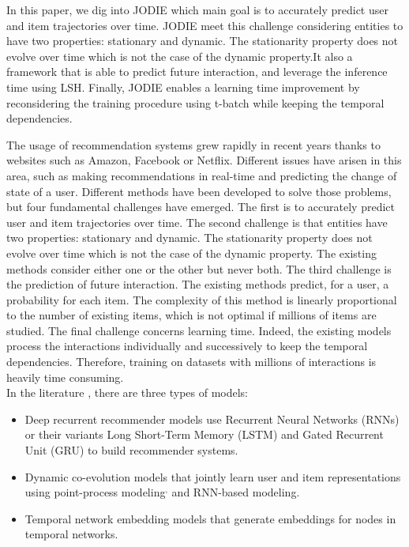 {In this paper, we dig into JODIE which main goal is to  accurately predict user and item trajectories over time. JODIE meet this challenge considering entities to have two properties: stationary and dynamic. The stationarity property does not evolve over time which is not the case of the dynamic property.It also a framework that is able to predict  future interaction, and leverage the inference time using LSH. Finally,  JODIE enables a learning time improvement by reconsidering the training procedure using t-batch while keeping the temporal dependencies.\\
}


\iffalse
The usage of recommendation systems grew rapidly in recent years thanks to websites such as Amazon, Facebook or Netflix. Different issues have arisen in this area, such as making recommendations in real-time and predicting the change of state of a user. Different methods have been developed to solve those problems, but four fundamental challenges have emerged. The first is to accurately predict user and item trajectories over time. The second challenge is that entities have two properties: stationary and dynamic. The stationarity property does not evolve over time which is not the case of the dynamic property. The existing methods consider either one or the other but never both. The third challenge is the prediction of future interaction. The existing methods predict, for a user, a probability for each item. The complexity of this method is linearly proportional to the number of existing items, which is not optimal if millions of items are studied. The final challenge concerns learning time. Indeed, the existing models process the interactions individually and successively to keep the temporal dependencies. Therefore, training on datasets with millions of interactions is heavily time consuming.\\

In the literature , there are three types of models:
\begin{itemize}
    \item Deep recurrent recommender models use Recurrent Neural Networks\supercite{Rumelhart1986} (RNNs) or their variants Long Short-Term Memory\supercite{LSTM} (LSTM) and Gated Recurrent Unit\supercite{https://doi.org/10.48550/arxiv.1406.1078GRU} (GRU) to build recommender systems.
    \item Dynamic co-evolution models that jointly learn user and item representations using point-process modeling\supercite{https://doi.org/10.48550/arxiv.1705.05742}$^,$\supercite{NIPS2016_53ed35c7} and RNN-based modeling\supercite{https://doi.org/10.48550/arxiv.1609.03675}.
    \item Temporal network embedding models that generate embeddings for nodes in temporal networks.
\end{itemize}

